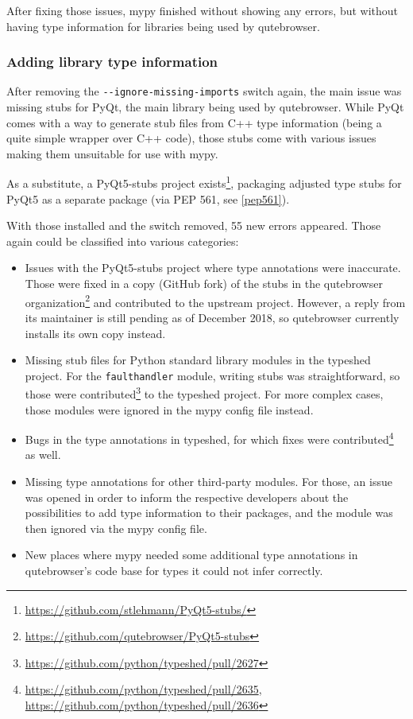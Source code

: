 \documentclass[a4paper,parskip=full]{scrreprt}
\begin{document}
After fixing those issues, mypy finished without showing any errors, but without
having type information for libraries being used by qutebrowser.

\subsubsection{Adding library type information}

After removing the \verb|--ignore-missing-imports| switch again, the main issue
was missing stubs for PyQt, the main library being used by qutebrowser. While
PyQt comes with a way to generate stub files from C++ type information (being a
quite simple wrapper over C++ code), those stubs come with various issues making
them unsuitable for use with mypy.

As a substitute, a PyQt5-stubs project
exists\footnote{\url{https://github.com/stlehmann/PyQt5-stubs/}}, packaging
adjusted type stubs for PyQt5 as a separate package (via PEP 561, see
\ref{pep561}).

With those installed and the switch removed, 55 new errors appeared. Those again
could be classified into various categories:

\begin{itemize}
  \item Issues with the PyQt5-stubs project where type annotations were
    inaccurate. Those were fixed in a copy (GitHub fork) of the stubs in the
    qutebrowser
    organization\footnote{\url{https://github.com/qutebrowser/PyQt5-stubs}} and
    contributed to the upstream project. However, a reply from its maintainer is
    still pending as of December 2018, so qutebrowser currently installs its own
    copy instead.
  \item Missing stub files for Python standard library modules in the typeshed
    project. For the \verb|faulthandler| module, writing stubs was
    straightforward, so those were
    contributed\footnote{\url{https://github.com/python/typeshed/pull/2627}} to
    the typeshed project. For more complex cases, those modules were ignored in
    the mypy config file instead.
  \item Bugs in the type annotations in typeshed, for which fixes were
    contributed\footnote{\url{https://github.com/python/typeshed/pull/2635}, \\
      \url{https://github.com/python/typeshed/pull/2636}} as well.
  \item Missing type annotations for other third-party modules. For those, an
    issue was opened in order to inform the respective developers about the
    possibilities to add type information to their packages, and the module was
    then ignored via the mypy config file.
  \item New places where mypy needed some additional type annotations in
    qutebrowser's code base for types it could not infer correctly.
\end{itemize}
\end{document}
